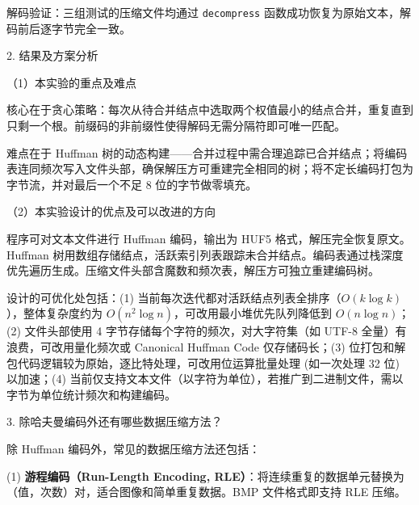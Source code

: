 \noindent\hspace*{2em}解码验证：三组测试的压缩文件均通过 \texttt{decompress} 函数成功恢复为原始文本，解码前后逐字节完全一致。\par
\noindent\hspace*{2em}2. 结果及方案分析\par
\noindent\hspace*{2em}（1）本实验的重点及难点\par
\noindent\hspace*{2em}核心在于贪心策略：每次从待合并结点中选取两个权值最小的结点合并，重复直到只剩一个根。前缀码的非前缀性使得解码无需分隔符即可唯一匹配。\par
\noindent\hspace*{2em}难点在于 Huffman 树的动态构建——合并过程中需合理追踪已合并结点；将编码表连同频次写入文件头部，确保解压方可重建完全相同的树；将不定长编码打包为字节流，并对最后一个不足 8 位的字节做零填充。\par
\noindent\hspace*{2em}（2）本实验设计的优点及可以改进的方向\par
\noindent\hspace*{2em}程序可对文本文件进行 Huffman 编码，输出为 HUF5 格式，解压完全恢复原文。Huffman 树用数组存储结点，活跃索引列表跟踪未合并结点。编码表通过栈深度优先遍历生成。压缩文件头部含魔数和频次表，解压方可独立重建编码树。\par
\noindent\hspace*{2em}设计的可优化处包括：(1) 当前每次迭代都对活跃结点列表全排序（$O(k\log k)$），整体复杂度约为 $O(n^2\log n)$，可改用最小堆优先队列降低到 $O(n\log n)$；(2) 文件头部使用 4 字节存储每个字符的频次，对大字符集（如 UTF-8 全量）有浪费，可改用量化频次或 Canonical Huffman Code 仅存储码长；(3) 位打包和解包代码逻辑较为原始，逐比特处理，可改用位运算批量处理 (如一次处理 32 位) 以加速；(4) 当前仅支持文本文件（以字符为单位），若推广到二进制文件，需以字节为单位统计频次和构建编码。\par
\noindent\hspace*{2em}3. 除哈夫曼编码外还有哪些数据压缩方法？\par
\noindent\hspace*{2em}除 Huffman 编码外，常见的数据压缩方法还包括：\par
\noindent\hspace*{2em}(1) \textbf{游程编码（Run-Length Encoding, RLE）}：将连续重复的数据单元替换为（值，次数）对，适合图像和简单重复数据。BMP 文件格式即支持 RLE 压缩。\par
